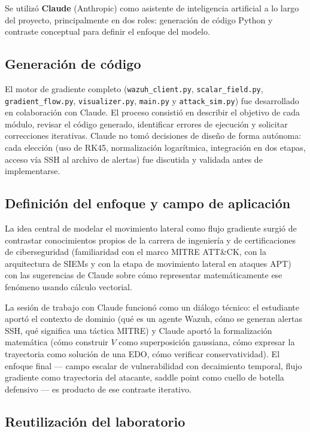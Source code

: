 \documentclass[12pt,a4paper]{article}
\begin{document}
Se utilizó \textbf{Claude} (Anthropic) como asistente de inteligencia
artificial a lo largo del proyecto, principalmente en dos roles:
generación de código Python y contraste conceptual para definir el
enfoque del modelo.

\subsection*{Generación de código}

El motor de gradiente completo (\texttt{wazuh\_client.py},
\texttt{scalar\_field.py}, \texttt{gradient\_flow.py},
\texttt{visualizer.py}, \texttt{main.py} y \texttt{attack\_sim.py})
fue desarrollado en colaboración con Claude. El proceso consistió en
describir el objetivo de cada módulo, revisar el código generado,
identificar errores de ejecución y solicitar correcciones iterativas.
Claude no tomó decisiones de diseño de forma autónoma: cada elección
(uso de RK45, normalización logarítmica, integración en dos etapas,
acceso vía SSH al archivo de alertas) fue discutida y validada antes
de implementarse.

\subsection*{Definición del enfoque y campo de aplicación}

La idea central de modelar el movimiento lateral como flujo gradiente
surgió de contrastar conocimientos propios de la carrera de ingeniería
y de certificaciones de ciberseguridad (familiaridad con el marco
MITRE ATT\&CK, con la arquitectura de SIEMs y con la etapa de
movimiento lateral en ataques APT) con las sugerencias de Claude sobre
cómo representar matemáticamente ese fenómeno usando cálculo vectorial.

La sesión de trabajo con Claude funcionó como un diálogo técnico: el
estudiante aportó el contexto de dominio (qué es un agente Wazuh, cómo
se generan alertas SSH, qué significa una táctica MITRE) y Claude
aportó la formalización matemática (cómo construir $V$ como
superposición gaussiana, cómo expresar la trayectoria como solución de
una EDO, cómo verificar conservatividad). El enfoque final — campo
escalar de vulnerabilidad con decaimiento temporal, flujo gradiente
como trayectoria del atacante, saddle point como cuello de botella
defensivo — es producto de ese contraste iterativo.

\subsection*{Reutilización del laboratorio}
\end{document}
